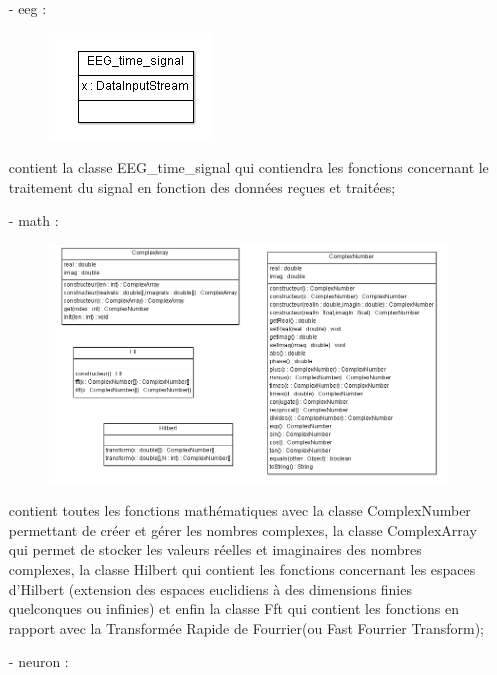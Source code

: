 	\begin{itemize}
			
	\item [-] eeg : 
		\begin{figure}[h!]
			\centering
		    \includegraphics []{../diagramme_classes/eeg.png} \\
			\label{fig_eeg}
  		\end{figure}
	 contient la classe EEG\_time\_signal qui contiendra les fonctions concernant le traitement du signal en fonction des données reçues et traitées;
	\item [-] math :
		\begin{figure}[h!]
			\centering
		    \includegraphics [scale=0.5]{../diagramme_classes/math.png} 
			\label{fig_math}
    		\end{figure} 
	contient toutes les fonctions mathématiques avec la classe ComplexNumber permettant de créer et gérer les nombres complexes, la classe ComplexArray qui permet de stocker les valeurs réelles et imaginaires des nombres complexes, la classe Hilbert qui contient les fonctions concernant les espaces d'Hilbert (extension des espaces euclidiens à des dimensions finies quelconques ou infinies) et enfin la classe Fft qui contient les fonctions en rapport avec la Transformée Rapide de Fourrier(ou Fast Fourrier Transform);
	\newpage
	\item [-] neuron : 

\end{itemize}
